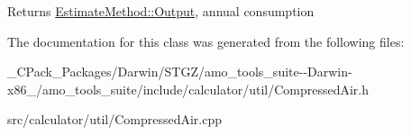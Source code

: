 \begin{DoxyReturn}{Returns}
\hyperlink{struct_estimate_method_1_1_output}{Estimate\+Method\+::\+Output}, annual consumption 
\end{DoxyReturn}


The documentation for this class was generated from the following files\+:\begin{DoxyCompactItemize}
\item 
\+\_\+\+C\+Pack\+\_\+\+Packages/\+Darwin/\+S\+T\+G\+Z/amo\+\_\+tools\+\_\+suite-\/-\/\+Darwin-\/x86\+\_/amo\+\_\+tools\+\_\+suite/include/calculator/util/Compressed\+Air.\+h\item 
src/calculator/util/Compressed\+Air.\+cpp\end{DoxyCompactItemize}

